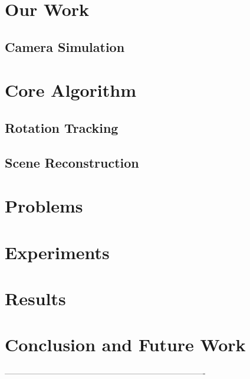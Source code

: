 \documentclass[10pt,twocolumn,letterpaper]{article}
\begin{document}
\section{Our Work}
\label{sec:our_work}


\subsection{Camera Simulation}
\label{sec:simulation}



\section{Core Algorithm}
\label{sec:core_algorithm}


\subsection{Rotation Tracking}
\label{sec:tracking}


\subsection{Scene Reconstruction}
\label{sec:scene_reconstruction}



\section{Problems}
\label{sec:problems}



\section{Experiments}
\label{sec:experiments}



\section{Results}
\label{sec:results}


\section{Conclusion and Future Work}

\label{sec:conclusion}

-------------------------------------------------------------------------
{\small


}
\end{document}
